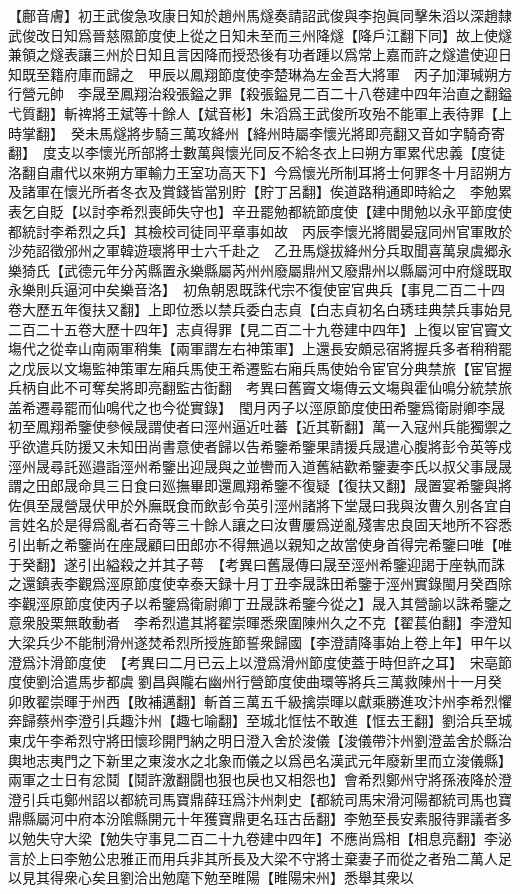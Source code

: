【鄜音膚】初王武俊急攻康日知於趙州馬燧奏請詔武俊與李抱眞同擊朱滔以深趙隸武俊改日知爲晉慈隰節度使上從之日知未至而三州降燧【降戶江翻下同】故上使燧兼領之燧表讓三州於日知且言因降而授恐後有功者踵以爲常上嘉而許之燧遣使迎日知既至籍府庫而歸之　甲辰以鳳翔節度使李楚琳為左金吾大將軍　丙子加渾瑊朔方行營元帥　李晟至鳳翔治殺張鎰之罪【殺張鎰見二百二十八卷建中四年治直之翻鎰弋質翻】斬禆將王斌等十餘人【斌音彬】朱滔爲王武俊所攻殆不能軍上表待罪【上時掌翻】　癸未馬燧將步騎三萬攻絳州【絳州時屬李懷光將即亮翻又音如字騎奇寄翻】　度支以李懷光所部將士數萬與懷光同反不給冬衣上曰朔方軍累代忠義【度徒洛翻自肅代以來朔方軍輸力王室功高天下】今爲懷光所制耳將士何罪冬十月詔朔方及諸軍在懷光所者冬衣及賞錢皆當别貯【貯丁呂翻】俟道路稍通即時給之　李勉累表乞自貶【以討李希烈喪師失守也】辛丑罷勉都統節度使【建中閒勉以永平節度使都統討李希烈之兵】其檢校司徒同平章事如故　丙辰李懷光將閻晏寇同州官軍敗於沙苑詔徵邠州之軍韓遊瓌將甲士六千赴之　乙丑馬燧拔絳州分兵取聞喜萬泉虞郷永樂猗氏【武德元年分芮縣置永樂縣屬芮州州廢屬鼎州又廢鼎州以縣屬河中府燧既取永樂則兵逼河中矣樂音洛】　初魚朝恩既誅代宗不復使宦官典兵【事見二百二十四卷大歷五年復扶又翻】上即位悉以禁兵委白志貞【白志貞初名白琇珪典禁兵事始見二百二十五卷大歷十四年】志貞得罪【見二百二十九卷建中四年】上復以宦官竇文塲代之從幸山南兩軍稍集【兩軍謂左右神策軍】上還長安頗忌宿將握兵多者稍稍罷之戊辰以文塲監神策軍左廂兵馬使王希遷監右廂兵馬使始令宦官分典禁旅【宦官握兵柄自此不可奪矣將即亮翻監古衘翻　考異曰舊竇文塲傳云文塲與霍仙鳴分統禁旅盖希遷尋罷而仙鳴代之也今從實錄】　閠月丙子以涇原節度使田希鑒爲衛尉卿李晟初至鳳翔希鑒使參候晟謂使者曰涇州逼近吐蕃【近其靳翻】萬一入寇州兵能獨禦之乎欲遣兵防援又未知田尚書意使者歸以告希鑒希鑒果請援兵晟遣心腹將彭令英等戍涇州晟尋託廵邉詣涇州希鑒出迎晟與之並轡而入道舊結歡希鑒妻李氏以叔父事晟晟謂之田郎晟命具三日食曰廵撫畢即還鳳翔希鑒不復疑【復扶又翻】晟置宴希鑒與將佐俱至晟營晟伏甲於外廡既食而飲彭令英引涇州諸將下堂晟曰我與汝曹久别各宜自言姓名於是得爲亂者石奇等三十餘人讓之曰汝曹屢爲逆亂殘害忠良固天地所不容悉引出斬之希鑒尚在座晟顧曰田郎亦不得無過以親知之故當使身首得完希鑒曰唯【唯于癸翻】遂引出縊殺之并其子萼　【考異曰舊晟傳曰晟至涇州希鑒迎謁于座執而誅之還鎮表李觀爲涇原節度使幸泰天録十月丁丑李晟誅田希鑒于涇州實錄閩月癸酉除李觀涇原節度使丙子以希鑒爲衛尉卿丁丑晟誅希鑒今從之】晟入其營諭以誅希鑒之意衆股栗無敢動者　李希烈遣其將翟崇暉悉衆圍陳州久之不克【翟萇伯翻】李澄知大梁兵少不能制滑州遂焚希烈所授旌節誓衆歸國【李澄請降事始上卷上年】甲午以澄爲汴滑節度使　【考異曰二月已云上以澄爲滑州節度使蓋于時但許之耳】　宋亳節度使劉洽遣馬步都虞劉昌與隴右幽州行營節度使曲環等將兵三萬救陳州十一月癸卯敗翟崇暉于州西【敗補邁翻】斬首三萬五千級擒崇暉以獻乘勝進攻汴州李希烈懼奔歸蔡州李澄引兵趣汴州【趣七喻翻】至城北恇怯不敢進【恇去王翻】劉洽兵至城東戊午李希烈守將田懷珍開門納之明日澄入舍於浚儀【浚儀帶汴州劉澄盖舍於縣治輿地志夷門之下新里之東浚水之北象而儀之以爲邑名漢武元年廢新里而立浚儀縣】兩軍之士日有忿鬩【鬩許激翻闘也狠也戾也又相怨也】會希烈鄭州守將孫液降於澄澄引兵屯鄭州詔以都統司馬寶鼎薛珏爲汴州刺史【都統司馬宋滑河陽都統司馬也寶鼎縣屬河中府本汾隂縣開元十年獲寶鼎更名珏古岳翻】李勉至長安素服待罪議者多以勉失守大梁【勉失守事見二百二十九卷建中四年】不應尚爲相【相息亮翻】李泌言於上曰李勉公忠雅正而用兵非其所長及大梁不守將士棄妻子而從之者殆二萬人足以見其得衆心矣且劉洽出勉麾下勉至睢陽【睢陽宋州】悉舉其衆以